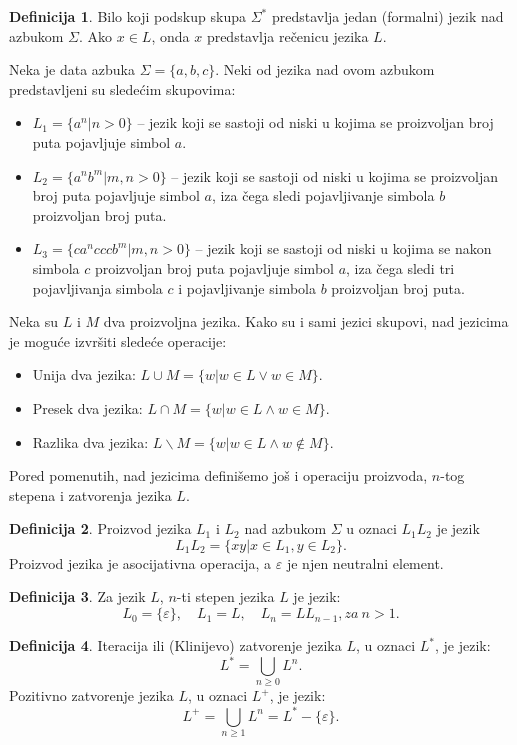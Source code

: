 \documentclass[12pt,oneside]{memoir}
\theoremstyle{plain}
\theoremstyle{definition}
\newtheorem{defn}{Definicija} %
\begin{document}
\begin{defn}
Bilo koji podskup skupa $\Sigma^*$ predstavlja jedan (formalni) jezik nad azbukom $\Sigma$. Ako $x \in L$, onda $x$ predstavlja rečenicu jezika $L$.
\end{defn}

Neka je data azbuka $\Sigma = \{ a, b, c\}$. Neki od jezika nad ovom azbukom predstavljeni su sledećim skupovima:
\begin{itemize}
\item[] $L_1 = \{a^n | n > 0\}$ – jezik koji se sastoji od niski u kojima se proizvoljan broj puta pojavljuje simbol $a$.
\item[] $L_2 = \{a^nb^m | m, n > 0\}$ – jezik koji se sastoji od niski u kojima se proizvoljan broj puta pojavljuje simbol $a$, iza čega sledi pojavljivanje simbola $b$ proizvoljan broj puta.
\item[] $L_3 = \{ca^ncccb^m | m, n > 0\}$ – jezik koji se sastoji od niski u kojima se nakon simbola $c$ proizvoljan broj puta pojavljuje simbol $a$, iza čega sledi tri pojavljivanja simbola $c$ i pojavljivanje simbola $b$ proizvoljan broj puta.
\end{itemize}

Neka su $L$ i $M$ dva proizvoljna jezika. Kako su i sami jezici skupovi, nad jezicima je moguće izvršiti sledeće operacije:
\begin{itemize}
\item Unija dva jezika: $L \cup M = \{w| w \in L \vee w\in M \}$.
\item Presek dva jezika: $L \cap M = \{w| w \in L \wedge w\in M \}$.
\item Razlika dva jezika: $L \backslash M = \{w| w \in L \wedge w\notin M \}$.
\end{itemize}
 Pored pomenutih, nad jezicima definišemo još i operaciju proizvoda, $n$-tog stepena i zatvorenja jezika $L$.
\begin{defn}
Proizvod jezika $L_1$ i $L_2$ nad azbukom $\Sigma$ u oznaci $L_1L_2$ je jezik $$L_1L_2 = \{xy | x \in L_1, y \in L_2\}.$$
Proizvod jezika je asocijativna operacija, a {$\varepsilon$} je njen neutralni element.
\end{defn}

\begin{defn}
Za jezik $L$, $n$-ti stepen jezika $L$ je jezik: 
$$L_0 = \{ \varepsilon\},\quad L_1 = L,\quad L_n = LL_{n-1}, za\  n>1.$$ 
\end{defn}

\begin{defn}
Iteracija ili (Klinijevo) zatvorenje jezika $L$, u oznaci $L^*$, je jezik:
$$ L^* = \bigcup_{n\geq0}L^n.$$
Pozitivno zatvorenje jezika $L$, u oznaci $L^+$, je jezik:
$$ L^+ = \bigcup_{n\geq1}L^n = L^* - \{\varepsilon\}.$$
\end{defn}
\end{document}
